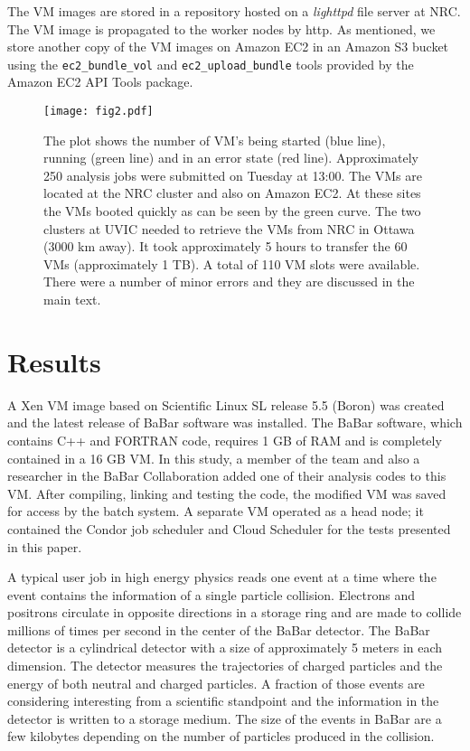 \documentclass[10pt, conference, compsocconf]{IEEEtran}
\begin{document}
The VM images are stored in a repository hosted on a \emph{lighttpd} file server at NRC.
The VM image is propagated to the worker nodes by http.
As mentioned, we store another copy of the VM images on Amazon EC2 
in an Amazon S3 bucket using the \texttt{ec2\_bundle\_vol} and 
\texttt{ec2\_upload\_bundle} tools provided by the Amazon EC2 API Tools package.  



\begin{figure*}[ht]
\begin{center}
\texttt{[image: fig2.pdf]}
\end{center}
\caption{\label{fig:vms} 
The plot shows the number of VM's being started (blue line), running 
(green line) and in an error state (red line).
Approximately 250 analysis jobs were submitted on Tuesday at 13:00.
The VMs are located at the NRC cluster and also on Amazon EC2. 
At these sites the VMs booted quickly as can be seen by the green curve.
The two clusters at UVIC needed to retrieve the VMs from NRC in Ottawa 
(3000 km away).
It took approximately 5 hours to transfer the 60 VMs (approximately 1 TB).
A total of 110 VM slots were available.
There were a number of minor errors and they are discussed in the main text.
}
\end{figure*}

\section{Results}

A Xen VM image based on Scientific Linux SL release 5.5 (Boron) was 
created and the latest release of BaBar software was installed.
The BaBar software, which contains C++ and FORTRAN code, requires 1 GB of RAM
and is completely contained in a 16 GB VM. 
In this study, a member of the team and also a researcher in the BaBar 
Collaboration added one of their analysis codes to this VM.
After compiling, linking and testing the code, the modified VM was 
saved for access by the batch system.
A separate VM operated as a head node; it contained the Condor job 
scheduler and Cloud Scheduler for the tests presented in this paper.

A typical user job in high energy physics reads one event at a time 
where the event contains the information of a single particle collision.
Electrons and positrons circulate in opposite directions in a 
storage ring and are made to collide millions of times per second
in the center of the BaBar detector.
The BaBar detector is a cylindrical detector with a size of approximately
5 meters in each dimension. 
The detector measures the trajectories of charged particles and 
the energy of both neutral and charged particles.
A fraction of those events are considering interesting from a scientific
standpoint and the information in the detector is written to a storage medium.
The size of the events in BaBar are a few kilobytes depending on
the number of particles produced in the collision.
\end{document}
